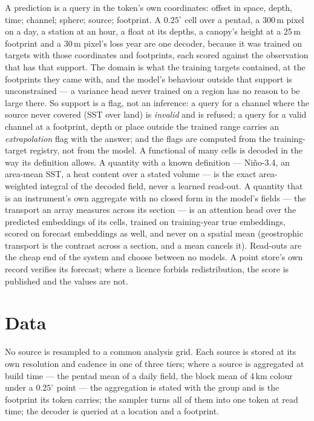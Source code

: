 \documentclass[10pt]{article}
\begin{document}
A prediction is a query in the token's own coordinates: offset in space,
depth, time; channel; sphere; source; footprint. A $0.25^\circ$ cell over a
pentad, a 300\,m pixel on a day, a station at an hour, a float at its
depths, a canopy's height at a 25\,m footprint and a 30\,m pixel's loss year
are one decoder, because it was trained on targets with those coordinates
and footprints, each scored against the observation that has that support.
The domain is what the training targets contained, at the footprints they
came with, and the model's behaviour outside that support is unconstrained
--- a variance head never trained on a region has no reason to be large
there. So support is a flag, not an inference: a query for a channel where
the source never covered (SST over land) is \emph{invalid} and is refused;
a query for a valid channel at a footprint, depth or place outside the
trained range carries an \emph{extrapolation} flag with the answer; and the
flags are computed from the training-target registry, not from the model.
A functional of many cells is decoded in the way its definition allows. A
quantity with a known definition --- Ni\~no-3.4, an area-mean SST, a heat
content over a stated volume --- is the exact area-weighted integral of the
decoded field, never a learned read-out. A quantity that is an instrument's
own aggregate with no closed form in the model's fields --- the transport an
array measures across its section --- is an attention head over the
predicted embeddings of its cells, trained on training-year true
embeddings, scored on forecast embeddings as well, and never on a spatial
mean (geostrophic transport is the contrast across a section, and a mean
cancels it). Read-outs are the cheap end of the system and choose between no
models. A point store's own record verifies its forecast; where a licence
forbids redistribution, the score is published and the values are not.

\section{Data}\label{sec:data}

No source is resampled to a common analysis grid. Each source is stored at
its own resolution and cadence in one of three tiers; where a source is
aggregated at build time --- the pentad mean of a daily field, the block mean
of 4\,km colour under a $0.25^\circ$ point --- the aggregation is stated with
the group and is the footprint its token carries; the sampler turns all of
them into one token at read time; the decoder is queried at a location and a
footprint.
\end{document}
